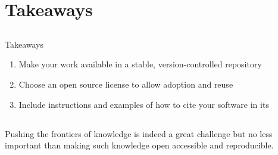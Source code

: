 \section{Takeaways}


\subsection{}
{

\begin{frame}{Takeaways}
 
\begin{enumerate}
\item Make your work available in a stable, version-controlled repository
\item Choose an open source license to allow adoption and reuse
\item Include instructions and examples of how to cite your software in its
\end{enumerate}

	
\end{frame}
}





\subsection{}
{

\begin{frame}{}
 
\large 
Pushing the frontiers of knowledge is indeed a great challenge 
but no less important than making such knowledge 
open accessible and reproducible.	

    \begin{figure}
   \end{figure}
	


\end{frame}
}




